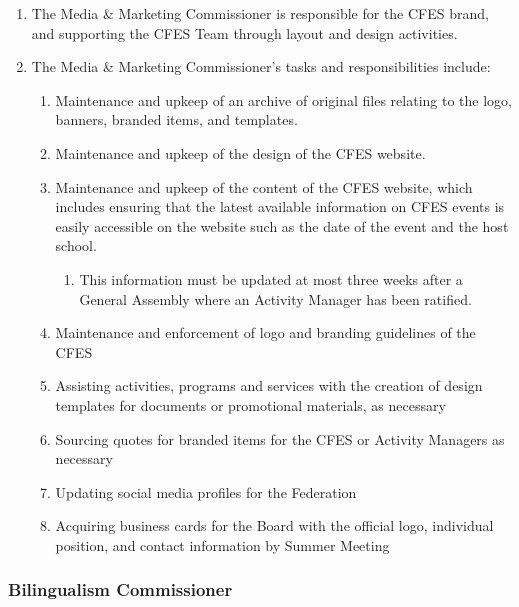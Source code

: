\begin{enumerate}
 \item
  The Media \& Marketing Commissioner is responsible for the CFES brand, and supporting the CFES Team through layout and design activities.
 \item
  The Media \& Marketing Commissioner’s tasks and responsibilities include:

  \begin{enumerate}
   \item
    Maintenance and upkeep of an archive of original files relating to the logo, banners, branded items, and templates.
   \item
    Maintenance and upkeep of the design of the CFES website.
   \item
    Maintenance and upkeep of the content of the CFES website, which includes ensuring that the latest available information on CFES events is easily accessible on the website such as the date of the event and the host school.

    \begin{enumerate}
     \item
      This information must be updated at most three weeks after a General Assembly where an Activity Manager has been ratified.
    \end{enumerate}
   \item
    Maintenance and enforcement of logo and branding guidelines of the CFES
   \item
    Assisting activities, programs and services with the creation of design templates for documents or promotional materials, as necessary
   \item
    Sourcing quotes for branded items for the CFES or Activity Managers as necessary
   \item
    Updating social media profiles for the Federation
   \item
    Acquiring business cards for the Board with the official logo, individual position, and contact information by Summer Meeting
  \end{enumerate}
\end{enumerate}

\subsubsection{Bilingualism Commissioner}
\label{bilingualism-commissioner}

